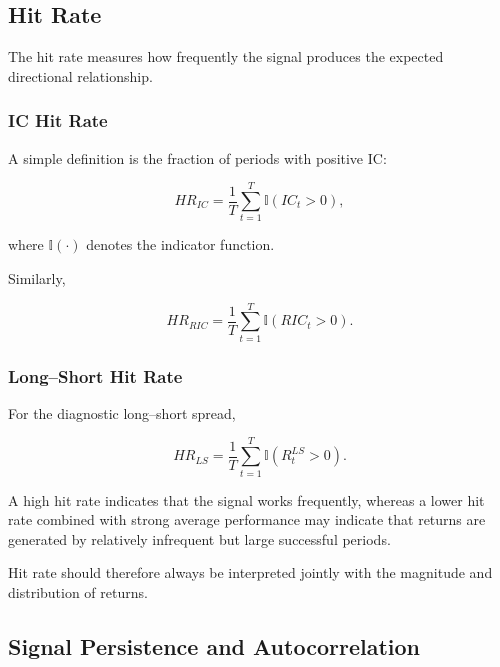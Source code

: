 \documentclass[11pt,a4paper]{article}
\begin{document}
\subsection{Hit Rate}
\label{subsec:signal_hit_rate}

The hit rate measures how frequently the signal produces the expected
directional relationship.


\subsubsection{IC Hit Rate}

A simple definition is the fraction of periods with positive IC:

\begin{equation}
\boxed{
HR_{IC}
=
\frac{1}{T}
\sum_{t=1}^{T}
\mathbb{I}
\left(
IC_t>0
\right),
}
\end{equation}

where $\mathbb{I}(\cdot)$ denotes the indicator function.

Similarly,

\begin{equation}
HR_{RIC}
=
\frac{1}{T}
\sum_{t=1}^{T}
\mathbb{I}
\left(
RIC_t>0
\right).
\end{equation}


\subsubsection{Long--Short Hit Rate}

For the diagnostic long--short spread,

\begin{equation}
\boxed{
HR_{LS}
=
\frac{1}{T}
\sum_{t=1}^{T}
\mathbb{I}
\left(
R_t^{LS}>0
\right).
}
\end{equation}

A high hit rate indicates that the signal works frequently, whereas a lower hit
rate combined with strong average performance may indicate that returns are
generated by relatively infrequent but large successful periods.

Hit rate should therefore always be interpreted jointly with the magnitude and
distribution of returns.


\subsection{Signal Persistence and Autocorrelation}
\label{subsec:signal_persistence_autocorrelation}
\end{document}
